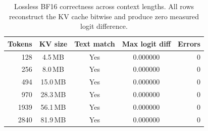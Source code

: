 \begin{table}[t]
\centering
\small
\caption{Lossless BF16 correctness across context lengths. All rows reconstruct the KV cache bitwise and produce zero measured logit difference.}
\label{tab:correctness}
\begin{tabular}{rcccr}
\toprule
Tokens & KV size & Text match & Max logit diff & Errors \\
\midrule
128 & 4.5\,MB & Yes & 0.000000 & 0 \\
256 & 8.0\,MB & Yes & 0.000000 & 0 \\
494 & 15.0\,MB & Yes & 0.000000 & 0 \\
970 & 28.3\,MB & Yes & 0.000000 & 0 \\
1939 & 56.1\,MB & Yes & 0.000000 & 0 \\
2840 & 81.9\,MB & Yes & 0.000000 & 0 \\
\bottomrule
\end{tabular}
\end{table}
